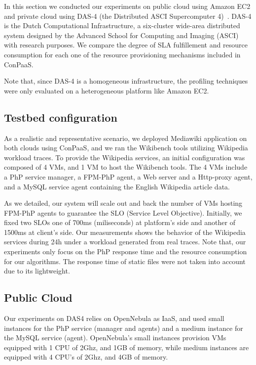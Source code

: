 In this section we conducted our experiments on public cloud using Amazon EC2 and private cloud using DAS-4 (the Distributed ASCI Supercomputer 4)~\cite{das4}. DAS-4 is the Dutch Computational Infrastructure, a six-cluster wide-area distributed system designed by the Advanced School for Computing and Imaging (ASCI) with research purposes.  We compare the degree of SLA fulfillement and resource consumption for each one of the resource provisioning mechanisms included in ConPaaS.

Note that, since DAS-4 is a homogeneous infrastructure, the profiling techniques were only evaluated on a heterogeneous platform like Amazon EC2. 


\subsection{Testbed configuration}

As a realistic and representative scenario, we deployed Mediawiki application on both clouds using ConPaaS, and we ran the Wikibench tools utilizing Wikipedia workload traces.  To provide the Wikipedia services, an initial configuration was composed of 4 VMs, and 1 VM to host the Wikibench tools. The 4 VMs include a PhP service manager, a FPM-PhP agent, a Web server and a Http-proxy agent, and a MySQL service agent containing the English Wikipedia article data.

As we detailed, our system will scale out and back the number of VMs hosting FPM-PhP agents to guarantee the SLO (Service Level Objective). Initially, we fixed two SLOs one of 700ms (miliseconds) at platform's side and another of 1500ms at client's side. Our measurements shows the behavior of the Wikipedia services during 24h under a workload generated from real traces. Note that, our experiments only focus on the PhP response time and the resource consumption for our algorithms. The response time of static files were not taken into account due to its lightweight. 

\subsection{Public Cloud}

Our experiments on DAS4 relies on OpenNebula as IaaS, and used small instances for the PhP service (manager and agents) and a medium instance for the MySQL service (agent). OpenNebula's small instances provision VMs equipped with 1 CPU of 2Ghz, and 1GB of memory, while medium instances are equipped with 4 CPU's of 2Ghz, and 4GB of memory.

